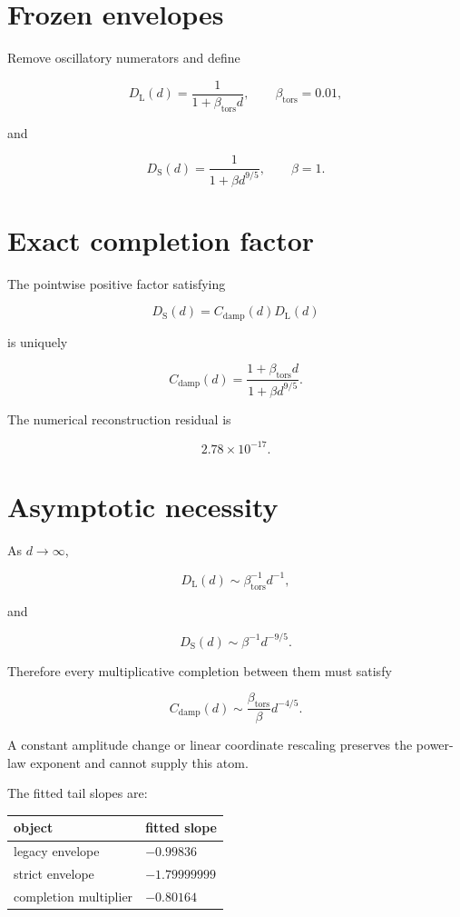 \documentclass[11pt,a4paper,openany]{report}
\begin{document}
\section{Frozen envelopes}

Remove oscillatory numerators and define

\[
D_{\mathrm L}(d)
=
\frac1{1+\beta_{\mathrm{tors}}d},
\qquad
\beta_{\mathrm{tors}}=0.01,
\]

and

\[
D_{\mathrm S}(d)
=
\frac1{1+\beta d^{9/5}},
\qquad
\beta=1.
\]

\section{Exact completion factor}

The pointwise positive factor satisfying

\[
D_{\mathrm S}(d)
=
C_{\mathrm{damp}}(d)D_{\mathrm L}(d)
\]

is uniquely

\[
C_{\mathrm{damp}}(d)
=
\frac{1+\beta_{\mathrm{tors}}d}
{1+\beta d^{9/5}}.
\]

The numerical reconstruction residual is

\[
2.78\times10^{-17}.
\]

\section{Asymptotic necessity}

As \(d\to\infty\),

\[
D_{\mathrm L}(d)\sim\beta_{\mathrm{tors}}^{-1}d^{-1},
\]

and

\[
D_{\mathrm S}(d)\sim\beta^{-1}d^{-9/5}.
\]

Therefore every multiplicative completion between them must satisfy

\[
C_{\mathrm{damp}}(d)
\sim
\frac{\beta_{\mathrm{tors}}}{\beta}
d^{-4/5}.
\]

A constant amplitude change or linear coordinate rescaling preserves the power-law exponent and cannot supply this atom.

The fitted tail slopes are:

\begin{center}
\begingroup\small
\setlength{\tabcolsep}{3.5pt}
\renewcommand{\arraystretch}{1.16}
\begin{longtable}{@{}p{}p{}@{}}
\toprule
\textbf{object} & \textbf{fitted slope} \\
\midrule
\endhead
legacy envelope & \(-0.99836\) \\
strict envelope & \(-1.79999999\) \\
completion multiplier & \(-0.80164\) \\
\bottomrule
\end{longtable}
\endgroup
\end{center}
\end{document}
